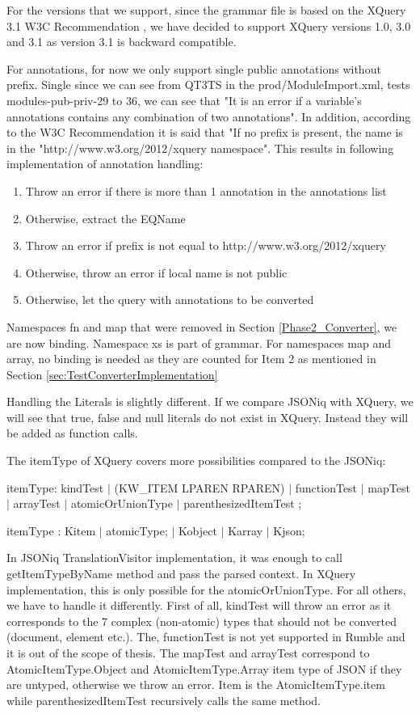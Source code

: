 For the versions that we support, since the grammar file is based on the XQuery 3.1 W3C Recommendation \cite{XQueryRecommendation}, we have decided to support XQuery versions 1.0, 3.0 and 3.1 as version  3.1 is backward compatible.

For annotations, for now we only support single public annotations without prefix. Single since we can see from QT3TS in the prod/ModuleImport.xml, tests modules-pub-priv-29 to 36, we can see that "It is an error if a variable's annotations contains any combination of two annotations". In addition, according to the W3C Recommendation \cite{XQueryRecommendation} it is said that "If no prefix is present, the name is in the "http://www.w3.org/2012/xquery namespace". This results in following implementation of annotation handling:
\begin{enumerate}
	\item Throw an error if there is more than 1 annotation in the annotations list
	\item Otherwise, extract the EQName
	\item Throw an error if prefix is not equal to http://www.w3.org/2012/xquery 
	\item Otherwise, throw an error if local name is not public
	\item Otherwise, let the query with annotations to be converted
\end{enumerate}

Namespaces fn and map that were removed in Section \ref{Phase2_Converter}, we are now binding. Namespace xs is part of grammar. For namespaces map and array, no binding is needed as they are counted for Item 2 as mentioned in Section \ref{sec:TestConverterImplementation}

Handling the Literals is slightly different. If we compare JSONiq with XQuery, we will see that true, false and null literals do not exist in XQuery. Instead they will be added as function calls.

The itemType of XQuery covers more possibilities compared to the JSONiq:

itemType: kindTest
$|$ (KW\_ITEM LPAREN RPAREN)
$|$ functionTest
$|$ mapTest
$|$ arrayTest
$|$ atomicOrUnionType
$|$ parenthesizedItemTest ;

itemType                : Kitem
$|$ atomicType;
$|$ Kobject
$|$ Karray
$|$ Kjson;

In JSONiq TranslationVisitor implementation, it was enough to call getItemTypeByName method and pass the parsed context. In XQuery implementation, this is only possible for the atomicOrUnionType. For all others, we have to handle it differently. First of all, kindTest will throw an error as it corresponds to the 7 complex (non-atomic) types that should not be converted (document, element etc.). The, functionTest is not yet supported in Rumble and it is out of the scope of thesis. The mapTest and arrayTest correspond to AtomicItemType.Object and AtomicItemType.Array item type of JSON if they are untyped, otherwise we throw an error. Item is the AtomicItemType.item while parenthesizedItemTest recursively calls the same method.

